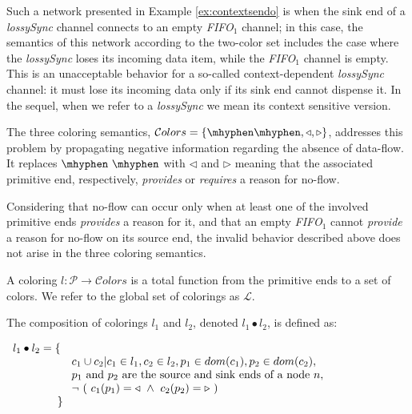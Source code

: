 Such a network presented in Example \ref{ex:contextsendo} is when the sink end of a \emph{lossySync} channel connects to an empty \emph{FIFO$_1$} channel; in this case, the semantics of this network according to the two-color set includes the case where the \emph{lossySync} loses its incoming data item, while the \emph{FIFO$_1$} channel is empty. This is an unacceptable behavior for a so-called context-dependent \emph{lossySync} channel: it must lose its incoming data only if its sink end cannot dispense it. In the sequel, when we refer to a \emph{lossySync} we mean its context sensitive version. 

The three coloring semantics, $\mathcal{C}olors = \{\flowsec, \triangleleft, \triangleright \}$, addresses this problem by propagating negative information regarding the absence of data-flow. It replaces $\noflowdoc$ with $\triangleleft$ and $\triangleright$ meaning that the associated primitive end, respectively, \emph{provides} or \emph{requires} a reason for no-flow. 

Considering that no-flow can occur only when at least one of the involved primitive ends \emph{provides} a reason for it, and that an empty \emph{FIFO$_1$} cannot \emph{provide} a reason for no-flow on its source end, the invalid behavior described above does not arise in the three coloring semantics.

\begin{definition}[Coloring]
A coloring $l : \mathcal{P} \rightarrow \mathcal{C}olors$ is a total function from the primitive ends to a set of colors. We refer to the global set of colorings as $\mathcal{L}$.
\end{definition}

\begin{definition}
The composition of colorings $l_1$ and $l_2$, denoted $l_1 \bullet l_2$, is defined as:

$\begin{array}{ll}
l_1 \bullet l_2 = \{&\\
& c_1 \cup c_2 | c_1 \in l_1, c_2 \in l_2, p_1 \in dom(c_1), p_2 \in dom(c_2),\\
& p_1 \text{ and } p_2 \text{ are the source and sink ends of a node} \ n, \\ & 
 \neg\ (\ c_1(p_1)=\triangleleft \ \wedge \ c_2(p_2)=\triangleright\ ) \\  & \hspace{-.45cm}  \}
\end{array}$
\end{definition}

